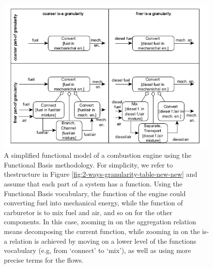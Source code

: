 \documentclass[
]{ceurart}
\begin{document}
\begin{figure}
    \centering
    \includegraphics[width=\textwidth]{2-ways-granularity-table-functions.png}
    \caption{\label{fig:2-ways-granularity-table-function}A simplified functional model of a combustion engine using the Functional Basis methodology. For simplicity, we refer to thestructure in Figure \ref{fig:2-ways-granularity-table-new-new} and assume that each part of a system has a function. Using the Functional Basis vocabulary, the function of the engine could converting fuel into mechanical energy, while the function of carburetor is to mix fuel and air, and so on for the other components. In this case, zooming in on the aggregation relation means decomposing the current function, while zooming in on the is-a relation is achieved by moving on a lower level of the functions vocabulary (e.g, from `connect' to `mix'), as well as using more precise terms for the flows.}
\end{figure}



\end{document}
